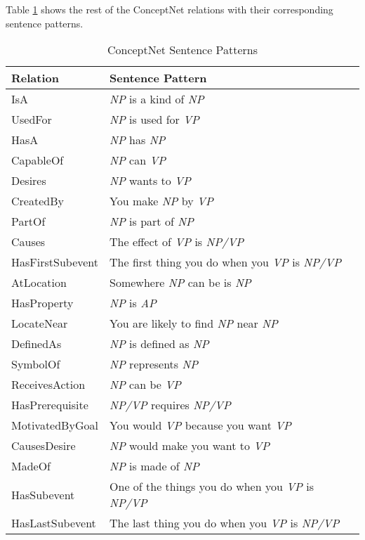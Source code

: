 Table \ref{tab:conceptnetrel} shows the rest of the ConceptNet \cite{Speer:2012} relations with their corresponding sentence patterns. 

\begin{table}[ht]   %
\centering
\caption{ConceptNet Sentence Patterns} \vspace{0.25em}
\begin{tabular}{|l|l|} \hline
Relation & Sentence Pattern \\ \hline
IsA & \textit{NP} is a kind of \textit{NP} \\ \hline
UsedFor & \textit{NP} is used for \textit{VP} \\ \hline
HasA & \textit{NP} has \textit{NP} \\ \hline
CapableOf & \textit{NP} can \textit{VP} \\ \hline
Desires & \textit{NP} wants to \textit{VP} \\ \hline
CreatedBy & You make \textit{NP} by \textit{VP} \\ \hline
PartOf & \textit{NP} is part of \textit{NP} \\ \hline
Causes & The effect of \textit{VP} is \textit{NP/VP} \\ \hline
HasFirstSubevent & The first thing you do when you \textit{VP} is \textit{NP/VP} \\ \hline
AtLocation & Somewhere \textit{NP} can be is \textit{NP} \\ \hline
HasProperty & \textit{NP} is \textit{AP} \\ \hline
LocateNear & You are likely to find \textit{NP} near \textit{NP} \\ \hline
DefinedAs & \textit{NP} is defined as \textit{NP} \\ \hline
SymbolOf & \textit{NP} represents \textit{NP} \\ \hline
ReceivesAction & \textit{NP} can be \textit{VP} \\ \hline
HasPrerequisite & \textit{NP/VP} requires \textit{NP/VP} \\ \hline
MotivatedByGoal & You would \textit{VP} because you want \textit{VP} \\ \hline
CausesDesire & \textit{NP} would make you want to \textit{VP} \\ \hline
MadeOf & \textit{NP} is made of \textit{NP} \\ \hline
HasSubevent & One of the things you do when you \textit{VP} is \textit{NP/VP} \\ \hline
HasLastSubevent & The last thing you do when you \textit{VP} is \textit{NP/VP} \\ \hline
\end{tabular}
\label{tab:conceptnetrel}
\end{table}

